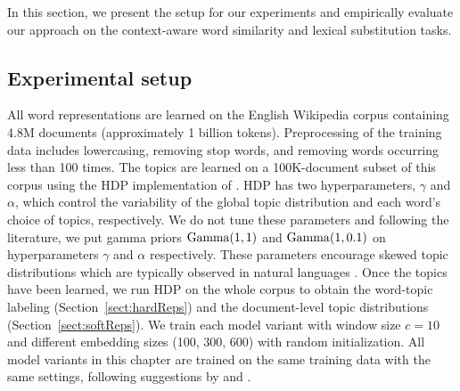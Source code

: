 In this section, we present the setup for our experiments and empirically evaluate our approach on the context-aware word similarity and lexical substitution tasks.

\subsection{Experimental setup} \label{embexpsetup}


All word representations are learned on the English Wikipedia corpus containing 4.8M documents (approximately 1 billion tokens).
Preprocessing of the training data includes lowercasing, removing stop words, and removing words occurring less than 100 times.
The topics are learned on a 100K-document subset of this corpus using the HDP implementation of \citet{teh2006hierarchical}.
%
HDP has two hyperparameters, $\gamma$  and $\alpha$, which control the variability of the global topic distribution and each word's choice of topics, respectively. We do not tune these parameters and following the literature, %
we put gamma priors $\operatorname*{Gamma}(1, 1)$ and $\operatorname*{Gamma}(1, 0.1)$ on hyperparameters $\gamma$ and $\alpha$ respectively. These parameters encourage skewed topic distributions which are typically observed in natural languages \citep{Gale1992}. 
%
Once the topics have been learned, we run HDP on the whole corpus to obtain the word-topic labeling (Section~\ref{sect:hardReps}) and the document-level topic distributions (Section~\ref{sect:softReps}).
%
We train each model variant with window size $c=10$ and different embedding sizes (100, 300, 600) with random initialization. 
All model variants in this chapter are trained on the same training data with the same settings, following suggestions by \citet{mikolov2013efficient} and \citet{levy2015improving}. 

